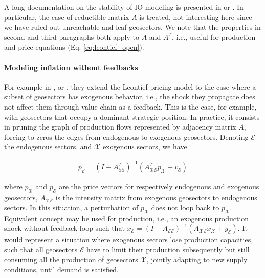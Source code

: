 \documentclass{article}
\begin{document}
\vspace{0.1cm}

A long documentation on the stability of IO modeling is presented in \cite{wood2009always} or \cite{ersel2011linear}. In particular, the case of reductible matrix $A$ is treated, not interesting here since we have ruled out unreachable and leaf geosectors. We note that the properties in second and third paragraphs both apply to $A$ and $A^T$, i.e., useful for production and price equations (Eq. \eqref{eq:leontief_open}).

\paragraph{Modeling inflation without feedbacks} For example in \cite{ipsen2023stress}, \cite{valadkhani2002assessing} or \cite{weber2024inflation}, they extend the Leontief pricing model to the case where a subset of geosectors has exogenous behavior, i.e., the shock they propagate does not affect them through value chain as a feedback. This is the case, for example, with geosectors that occupy a dominant strategic position.  In practice, it consists in pruning the graph of production flows represented by adjacency matrix $A$, forcing to zeros the edges from endogenous to exogenous geosectors. Denoting $\mathcal{E}$ the endogenous sectors, and $\mathcal{X}$ exogenous sectors, we have 

\begin{align}
    p_\mathcal{E} = \left( I - A_{\mathcal{EE}}^T \right)^{-1} \left( A_{\mathcal{XE}}^T p_\mathcal{X} + v_\mathcal{E} \right)
\label{eq:leontief_exogenous_geosectors}
\end{align}

\noindent where $p_\mathcal{X}$ and $p_\mathcal{E}$ are the price vectors for respectively endogenous and exogenous geosectors, $A_{\mathcal{XE}}$ is the intensity matrix from exogenous geosectors to endogenous sectors. In this situation, a perturbation of $p_\mathcal{X}$ does not loop back to $p_\mathcal{X}$. Equivalent concept may be used for production, i.e., an exogenous production shock without feedback loop such that $x_\mathcal{E} = \left( I - A_{\mathcal{EE}} \right)^{-1} \left( A_{\mathcal{XE}} x_\mathcal{X} + y_\mathcal{E} \right)$. It would represent a situation where exogenous sectors lose production capacities, such that all geosectors $\mathcal{E}$ have to limit their production subsequently but still consuming all the production of geosectors $\mathcal{X}$, jointly adapting to new supply conditions, until demand is satisfied. 
\end{document}
